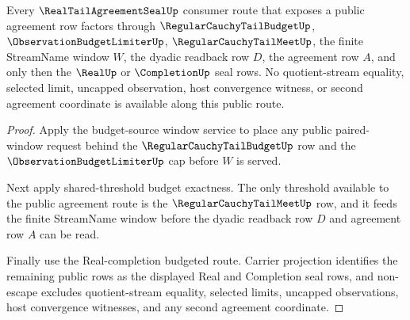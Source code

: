 \begin{theorem}
\label{thm:real-tail-agreement-seal-budget-threshold-readback-exhaustion}
Every $\RealTailAgreementSealUp$ consumer route that exposes a public agreement row factors through $\RegularCauchyTailBudgetUp$, $\ObservationBudgetLimiterUp$, $\RegularCauchyTailMeetUp$, the finite StreamName window $W$, the dyadic readback row $D$, the agreement row $A$, and only then the $\RealUp$ or $\CompletionUp$ seal rows. No quotient-stream equality, selected limit, uncapped observation, host convergence witness, or second agreement coordinate is available along this public route.
\end{theorem}
\begin{proof}
Apply the budget-source window service to place any public paired-window request behind the $\RegularCauchyTailBudgetUp$ row and the $\ObservationBudgetLimiterUp$ cap before $W$ is served.

Next apply shared-threshold budget exactness. The only threshold available to the public agreement route is the $\RegularCauchyTailMeetUp$ row, and it feeds the finite StreamName window before the dyadic readback row $D$ and agreement row $A$ can be read.

Finally use the Real-completion budgeted route. Carrier projection identifies the remaining public rows as the displayed Real and Completion seal rows, and non-escape excludes quotient-stream equality, selected limits, uncapped observations, host convergence witnesses, and any second agreement coordinate.
\end{proof}

